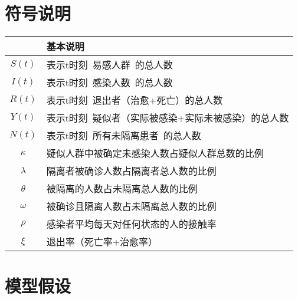 \documentclass[UTF8]{ctexart}
\begin{document}
\section{符号说明}
\begin{table}[!htbp]
	\begin{center}
		\begin{tabular}{c|l}
			\toprule[2pt]
			\rowcolor[gray]{0.8}

			\multicolumn{1}{m{8em}}{\centering 符号} & \multicolumn{1}{m{30em}}{\centering 基本说明}        \\


			\midrule[1.3pt]
			$S(t)$                                   & 表示t时刻\ 易感人群\ 的总人数                        \\
			$I(t)$                                   & 表示t时刻\ 感染人数\ 的总人数                        \\
			$R(t)$                                   & 表示t时刻\ 退出者（治愈+死亡）的总人数               \\
			$Y(t)$                                   & 表示t时刻\ 疑似者（实际被感染+实际未被感染）的总人数 \\
			$N(t)$                                   & 表示t时刻\ 所有未隔离患者\ 的总人数                  \\
			$\kappa$                                 & 疑似人群中被确定未感染人数占疑似人群总数的比例       \\
			$\lambda$                                & 隔离者被确诊人数占隔离者总人数的比例                 \\
			$\theta$                                 & 被隔离的人数占未隔离总人数的比例                     \\
			$\omega$                                 & 被确诊且隔离人数占未隔离总人数的比例                 \\
			$\rho$                                   & 感染者平均每天对任何状态的人的接触率                 \\
			$\xi$                                    & 退出率（死亡率+治愈率）                              \\
			\bottomrule[2pt]
		\end{tabular}
	\end{center}
\end{table}
\section{模型假设}
\end{document}
